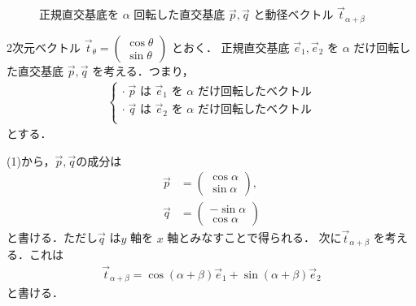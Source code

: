 \documentclass[../../main.tex]{subfiles}
\begin{document}
\begin{figure}[htb]
  \caption{正規直交基底を $\alpha$ 回転した直交基底 $\vec{p}, \vec{q}$ と動径ベクトル $\vec{t}_{\alpha+\beta}$}
  \label{fig:basis_rotation_addition_theorem}
\end{figure}

2次元ベクトル
$\vec{t}_\theta =
\begin{pmatrix} \cos\theta \\ \sin\theta
\end{pmatrix}$
とおく．
正規直交基底 $\vec{e}_1, \vec{e}_2$ を $\alpha$ だけ回転した直交基底 $\vec{p}, \vec{q}$ を考える．つまり，
\begin{align}
  \begin{cases}
    \cdot \; \vec{p} \text{ は } \vec{e}_1 \text{ を } \alpha \text{ だけ回転したベクトル} \\
    \cdot \; \vec{q} \text{ は } \vec{e}_2 \text{ を } \alpha \text{ だけ回転したベクトル} \\
  \end{cases}
\end{align}
とする．

(1)から，$\vec{p},\vec{q}$の成分は
\begin{align}
  \vec{p} &=
  \begin{pmatrix} \cos\alpha \\ \sin\alpha
  \end{pmatrix}, \\
  \vec{q} &=
  \begin{pmatrix} -\sin\alpha \\ \cos\alpha
  \end{pmatrix}
\end{align}
と書ける．ただし$\vec{q}$ は$y$ 軸を $x$ 軸とみなすことで得られる．
次に$\vec{t}_{\alpha+\beta}$ を考える．これは
\begin{align}
  \vec{t}_{\alpha+\beta} = \cos(\alpha+\beta)\vec{e}_1 + \sin(\alpha+\beta)\vec{e}_2 \label{eq:1}
\end{align}
と書ける．
\end{document}

